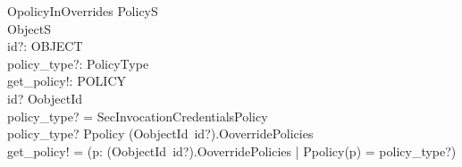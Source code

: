 \begin{schema}{OpolicyInOverrides}
  \Xi PolicyS \\
  \Xi ObjectS \\
  id?: OBJECT \\
  policy\_type?: PolicyType \\
  get\_policy!: POLICY \\
  \where
  id? \in \dom OobjectId \\
  policy\_type? = SecInvocationCredentialsPolicy \\
  policy\_type? \in Ppolicy \limg (OobjectId~id?).OoverridePolicies \rimg \\

  get\_policy! = (\mu p: (OobjectId~id?).OoverridePolicies | Ppolicy(p) =
  policy\_type?) \\
\end{schema}



